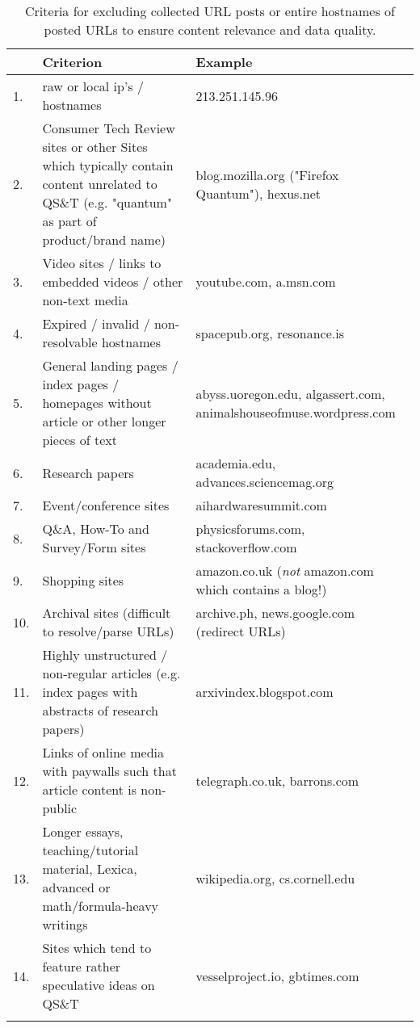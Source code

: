 
\begin{longtable}{lp{7cm}@{\hspace{10pt}} p{6cm}}
\toprule
 & \textbf{Criterion} & \textbf{Example} \\
\midrule
1. & raw or local ip's / hostnames & 213.251.145.96
 \\
\midrule
2. & Consumer Tech Review sites or other Sites which typically contain content unrelated to QS\&T (e.g. "quantum" as part of product/brand name) & blog.mozilla.org ("Firefox Quantum"), hexus.net \\
\midrule
3. & Video sites / links to embedded videos / other non-text media & youtube.com, a.msn.com \\
\midrule
4. & Expired / invalid / non-resolvable hostnames & spacepub.org, resonance.is \\
\midrule
5. & General landing pages / index pages / homepages without article or other longer pieces of text & abyss.uoregon.edu, algassert.com, animalshouseofmuse.wordpress.com \\
\midrule
6. &  Research papers &  academia.edu, advances.sciencemag.org \\
\midrule
7. & Event/conference sites & aihardwaresummit.com \\
\midrule
8. & Q\&A, How-To and Survey/Form sites & physicsforums.com, stackoverflow.com  \\
\midrule
9. & Shopping sites & amazon.co.uk (\textit{not} amazon.com which contains a blog!) \\
\midrule
10. & Archival sites (difficult to resolve/parse URLs) & archive.ph, news.google.com (redirect URLs)  \\
\midrule
11. & Highly unstructured / non-regular articles (e.g. index pages with abstracts of research papers) & arxivindex.blogspot.com \\
\midrule
12. & Links of online media with paywalls such that article content is non-public & telegraph.co.uk, barrons.com
 \\
\midrule
13. & Longer essays, teaching/tutorial material, Lexica, advanced or math/formula-heavy writings & wikipedia.org, cs.cornell.edu
 \\
\midrule
14. & Sites which tend to feature rather speculative ideas on QS\&T & vesselproject.io, gbtimes.com \\
\bottomrule
\caption{Criteria for excluding collected URL posts or entire  hostnames of posted URLs to ensure content relevance and data quality.}
\label{tab:exclcrit_hostnames}
\end{longtable}
